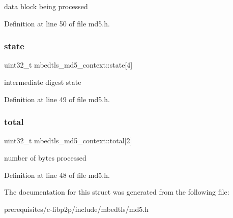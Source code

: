 data block being processed 

Definition at line 50 of file md5.\+h.

\mbox{\label{structmbedtls__md5__context_a17e9e7e1ab79b648e787969ee5b73929}} 
\subsubsection{\texorpdfstring{state}{state}}
{\footnotesize\ttfamily uint32\+\_\+t mbedtls\+\_\+md5\+\_\+context\+::state\mbox{[}4\mbox{]}}

intermediate digest state 

Definition at line 49 of file md5.\+h.

\mbox{\label{structmbedtls__md5__context_a69e02fc353b932fe9f58fcae64506c6e}} 
\subsubsection{\texorpdfstring{total}{total}}
{\footnotesize\ttfamily uint32\+\_\+t mbedtls\+\_\+md5\+\_\+context\+::total\mbox{[}2\mbox{]}}

number of bytes processed 

Definition at line 48 of file md5.\+h.



The documentation for this struct was generated from the following file\+:\begin{DoxyCompactItemize}
\item 
prerequisites/c-\/libp2p/include/mbedtls/md5.\+h\end{DoxyCompactItemize}
